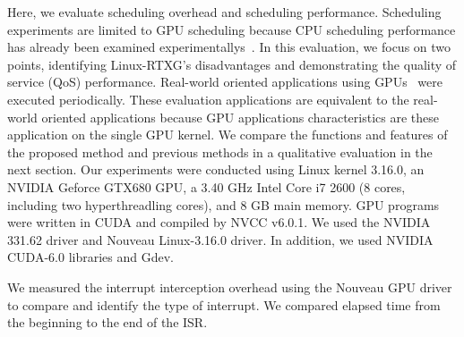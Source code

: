 \label{sec:evaluation}
Here, we evaluate scheduling overhead and scheduling performance.
Scheduling experiments are limited to GPU scheduling because CPU scheduling performance has already been examined experimentallys~\cite{kato2009loadable}.
In this evaluation, we focus on two points,
identifying Linux-RTXG’s disadvantages and demonstrating the quality of service (QoS) performance.
Real-world oriented applications using GPUs~\cite{hirabayashi:cpsna2013,tokamak} were executed periodically.
These evaluation applications are equivalent to the real-world oriented applications
because GPU applications characteristics are these application on the single GPU kernel.
\fi
We compare the functions and features of the proposed method and previous methods in a qualitative evaluation in the next section.
Our experiments were conducted using Linux kernel 3.16.0, an NVIDIA Geforce GTX680 GPU, a 3.40 GHz Intel Core i7 2600 (8 cores, including two hyperthreadling cores), and 8 GB main memory.
GPU programs were written in CUDA and compiled by NVCC v6.0.1.
We used the NVIDIA 331.62 driver and Nouveau Linux-3.16.0 driver.
In addition, we used NVIDIA CUDA-6.0 libraries and Gdev.

We measured the interrupt interception overhead using the Nouveau GPU driver to compare and identify the type of interrupt.
We compared elapsed time from the beginning to the end of the ISR.

